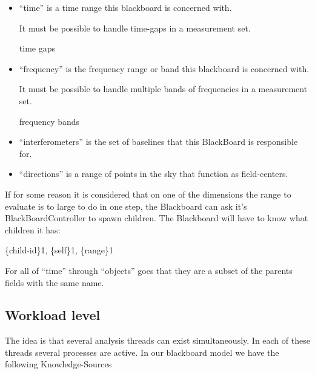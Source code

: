 \documentclass[]{lofar}
\begin{document}
      \begin{itemize}

	\item 

          ``time'' is a time range this blackboard is concerned with.
          \begin{requirement}
            It must be possible to handle time-gaps in a measurement set.
            \caption{time gaps\label{req:time-gaps}}
          \end{requirement}

	\item 

          ``frequency'' is the frequency range or band this blackboard
          is concerned with.

          \begin{requirement}
            It must be possible to handle multiple bands of frequencies in a
            measurement set.
            \caption{frequency bands\label{req:frequency-bands}}
          \end{requirement}

	\item 

          ``interferometers'' is the set of baselines that this
          BlackBoard is responsible for.

	\item 

          ``directions'' is a range of points in the sky that function
          as field-centers.

      \end{itemize}

      If for some reason it is considered that on one of the
      dimensions the range to evaluate is to large to do in one step,
      the Blackboard can ask it's BlackBoardController to spawn
      children. The Blackboard will have to know what children it has:

      \{child-id\}1, \{self\}1, \{range\}1

      For all of ``time'' through ``objects'' goes that they are a subset
      of the parents fields with the same name.

    \subsection{Workload level}
    \label{subsec:workload-level}\hypertarget{subsec:workload-level}{}%

      The idea is that several analysis threads can exist
      simultaneously. In each of these threads several processes are
      active. In our blackboard model we have the following
      Knowledge-Sources
\end{document}
